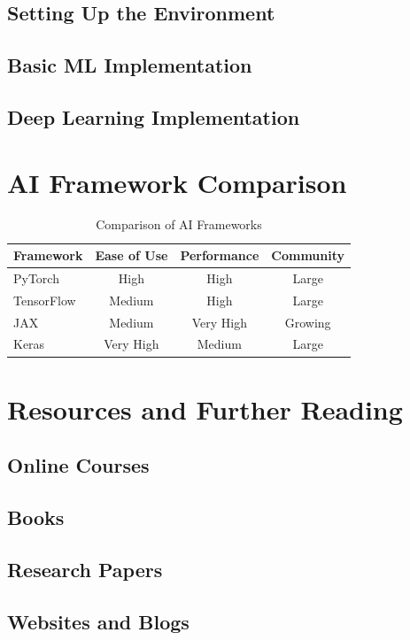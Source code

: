 \section{Setting Up the Environment}


\section{Basic ML Implementation}


\section{Deep Learning Implementation}


\chapter{AI Framework Comparison}
\label{app:frameworks}


\begin{table}[htbp]
\centering
\caption{Comparison of AI Frameworks}
\label{tab:framework-comparison}
\begin{tabular}{lccc}
\toprule
Framework & Ease of Use & Performance & Community \\
\midrule
PyTorch & High & High & Large \\
TensorFlow & Medium & High & Large \\
JAX & Medium & Very High & Growing \\
Keras & Very High & Medium & Large \\
\bottomrule
\end{tabular}
\end{table}

\chapter{Resources and Further Reading}
\label{app:resources}

\section{Online Courses}


\section{Books}


\section{Research Papers}


\section{Websites and Blogs}

